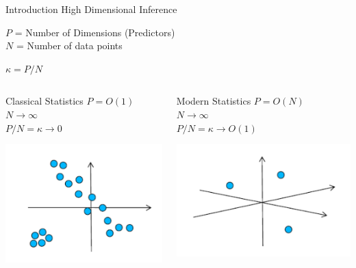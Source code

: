 \documentclass[pdf]{beamer}
\newcommand{\ra}{\rightarrow}
\begin{document}
\begin{frame}{Introduction High Dimensional Inference}

\parbox{.70\linewidth}{

$P$ = Number of Dimensions (Predictors)\\
$N$ = Number of data points 
}
\parbox{.25\linewidth}{
$\kappa = P/N$
}
\begin{columns}[t]
\begin{column}{.45\textwidth}
\begin{block}{Classical Statistics}
\vspace{.2in}
 $P = O(1)$ \\
 \vspace{.05in}
 $N \ra \infty$ \\
 \vspace{.05in}
 $P/N = \kappa \ra 0$
\end{block}
\begin{center}
\vspace{.1in}
\includegraphics[width = .65\linewidth]{lowDim.pdf}
\end{center}
\end{column}
\begin{column}{.45\textwidth}

\begin{block}{Modern Statistics}
\vspace{.2in}
 $P = O(N)$ \\
 \vspace{.05in}
 $N \ra \infty$ \\
 \vspace{.05in}
 $P/N = \kappa \ra O(1)$
\end{block}

\vspace{.1in}
\begin{center}
\includegraphics[width = .65\linewidth]{modernStats.pdf}
\end{center}


\end{column}
\end{columns}
\end{frame}
\end{document}
